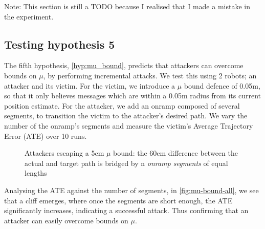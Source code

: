 Note: This section is still a TODO because I realised that I made a mistake in the experiment.


\subsection{Testing hypothesis 5}
The fifth hypothesis, \ref{hyp:mu_bound}, predicts that attackers can overcome bounds on $\mu$, by performing incremental attacks. We test this using 2 robots; an attacker and its victim. For the victim, we introduce a $\mu$ bound defence of 0.05m, so that it only believes messages which are within a 0.05m radius from its current position estimate. For the attacker, we add an onramp composed of several segments, to transition the victim to the attacker's desired path. We vary the number of the onramp's segments and measure the victim's Average Trajectory Error (ATE) over 10 runs.


\begin{figure}[!h]
	\centering
	\caption{Attackers escaping a 5cm $\mu$ bound: the 60cm difference between the actual and target path is bridged by n \textit{onramp segments} of equal lengths}
\end{figure}


Analysing the ATE against the number of segments, in \ref{fig:mu-bound-all}, we see that a cliff emerges, where once the segments are short enough, the ATE significantly increases, indicating a successful attack. Thus confirming that an attacker can easily overcome bounds on $\mu$.


